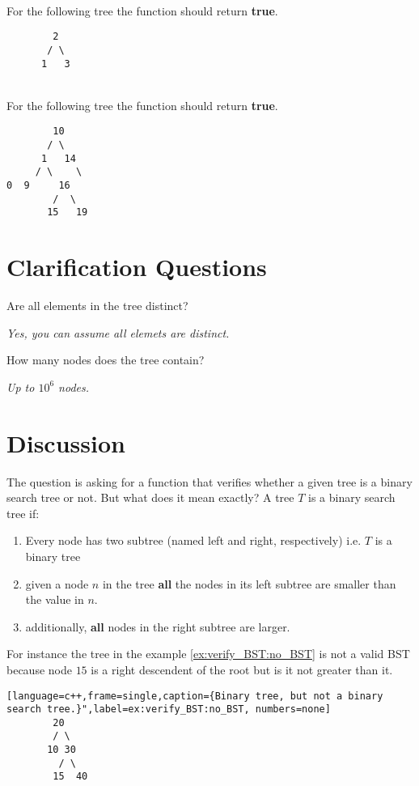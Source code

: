 \begin{example}
	\hfill \\
	For the following tree the function should return \textbf{true}.
	\begin{verbatim}
	    2
	   / \
	  1   3
	\end{verbatim}
	
\end{example}

\begin{example}
\label{example:verify_BST_:one}
	\hfill \\
	For the following tree the function should return \textbf{true}.
	\begin{verbatim}
	    10
	   / \
	  1   14
	 / \    \
0  9     16
        /  \
       15   19
	\end{verbatim}
	
\end{example}


\section{Clarification Questions}

\begin{QandA}
	\item Are all elements in the tree distinct?
	\begin{answered}
		\textit{Yes, you can assume all elemets are distinct.}
	\end{answered}
	\item How many nodes does the tree contain?
	\begin{answered}
		\textit{Up to $10^6$ nodes.}
	\end{answered}
\end{QandA}

\section{Discussion}
\label{verify_BST:sec:discussion}
The question is asking for a function that verifies whether a given tree is a binary search tree or not. But what does it mean exactly?
A tree $T$ is a binary search tree if:
\begin{enumerate}
	\item Every node has two subtree (named left and right, respectively) i.e. $T$ is a binary tree
	\item given a node $n$ in the tree \textbf{all} the nodes in its left subtree are smaller than the value in $n$.
	\item additionally,  \textbf{all} nodes in the right subtree are larger.
\end{enumerate}
For instance the tree in the example \ref{ex:verify_BST:no_BST} is not a valid BST because node $15$ is a right descendent of the root but is it not greater than it. 
\begin{lstlisting}[language=c++,frame=single,caption={Binary tree, but not a binary search tree.}",label=ex:verify_BST:no_BST, numbers=none]
	    20
	    / \
	   10 30
	     / \
	    15  40
\end{lstlisting}


